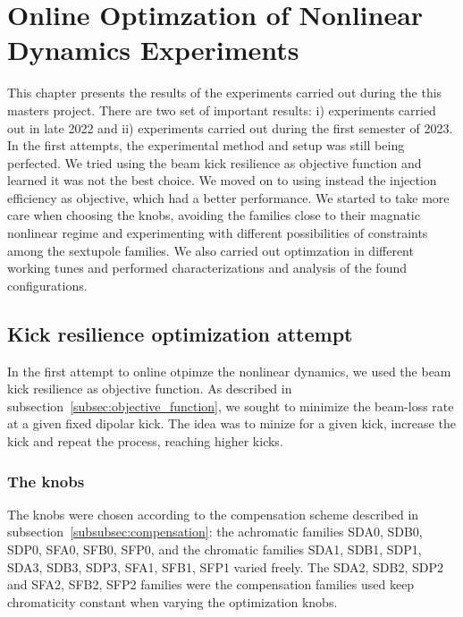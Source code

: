 \chapter{Online Optimzation of Nonlinear Dynamics Experiments}
This chapter presents the results of the experiments carried out during the this masters project. There are two set of important results: i) experiments carried out in late 2022 and ii) experiments carried out during the first semester of 2023. In the first attempts, the experimental method and setup was still being perfected. We tried using the beam kick resilience as objective function and learned it was not the best choice. We moved on to using instead the injection efficiency as objective, which had a better performance.  We started to take more care when choosing the knobs, avoiding the families close to their magnatic nonlinear regime and experimenting with different possibilities of constraints among the sextupole families. We also carried out optimzation in different working tunes and performed characterizations and analysis of the found configurations.
\section{Kick resilience optimization attempt}
In the first attempt to online otpimze the nonlinear dynamics, we used the beam kick resilience as objective function. As described in subsection~\ref{subsec:objective_function}, we sought to minimize the beam-loss rate at a given fixed dipolar kick. The idea was to minize for a given kick, increase the kick and repeat the process, reaching higher kicks.
\subsection{The knobs}
The knobs were chosen according to the compensation scheme described in subsection~\ref{subsubsec:compensation}: the achromatic families SDA0, SDB0, SDP0, SFA0, SFB0, SFP0, and the chromatic families SDA1, SDB1, SDP1, SDA3, SDB3, SDP3, SFA1, SFB1, SFP1 varied freely. The SDA2, SDB2, SDP2 and SFA2, SFB2, SFP2 families were the compensation families used keep chromaticity constant when varying the optimization knobs.
